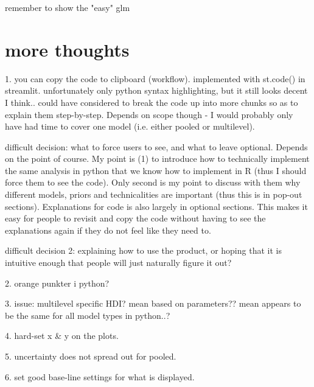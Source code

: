\documentclass[12pt]{article}
\begin{document}
remember to show the "easy" glm


\section{more thoughts}

1. you can copy the code to clipboard (workflow).
implemented with st.code() in streamlit.
unfortunately only python syntax highlighting,
but it still looks decent I think..
could have considered to break the code up
into more chunks so as to explain them step-by-step.
Depends on scope though - I would probably only have
had time to cover one model (i.e. either pooled or multilevel).

difficult decision:
what to force users to see, and what to
leave optional. Depends on the point of course.
My point is (1) to introduce how to technically
implement the same analysis in python that we
know how to implement in R (thus I should force
them to see the code). Only second is my point
to discuss with them why different models, priors
and technicalities are important (thus this is
in pop-out sections). Explanations for code is
also largely in optional sections. This makes it
easy for people to revisit and copy the code
without having to see the explanations again
if they do not feel like they need to.

difficult decision 2:
explaining how to use the product,
or hoping that it is intuitive enough that
people will just naturally figure it out?

2. orange punkter i python?

3. issue: multilevel specific HDI?
mean based on parameters??
mean appears to be the same for all model
types in python..?

4. hard-set x \& y on the plots.

5. uncertainty does not spread out for pooled.

6. set good base-line settings for what is
displayed.


\printbibliography
\end{document}
